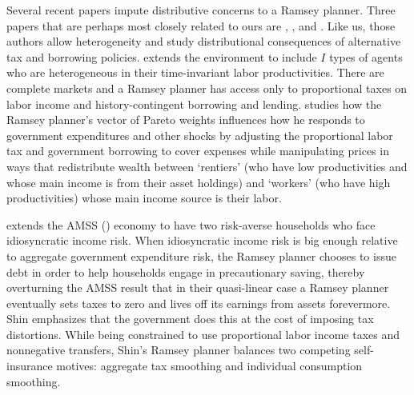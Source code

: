 \documentclass[thmsb,11pt]{article}
\begin{document}
Several recent papers impute distributive concerns to a Ramsey planner.
Three papers that are perhaps most closely related to ours are \citet{Bassetto1999}, \citet{shin2006ramsey}, and \citet{Wer07a}. Like us, those authors allow heterogeneity and study
distributional consequences of alternative tax and borrowing policies.
\citet{Bassetto1999} extends the \citet{LucasJr.1983} environment to include $I$ types of
agents who are heterogeneous in their time-invariant labor productivities. There are complete markets and a Ramsey planner  has access only
to proportional taxes on labor income and history-contingent borrowing and
lending. \citeauthor{Bassetto1999}  studies how the Ramsey planner's vector of Pareto weights
influences how he responds to government expenditures and other shocks by
adjusting the proportional labor tax and government borrowing to cover
expenses while manipulating prices in ways that redistribute wealth between
 `rentiers' (who have low productivities and  whose main income is from their asset holdings)
and  `workers' (who have high productivities) whose main income source is their labor.

\citet{shin2006ramsey} extends the AMSS  (\citet{Aiyagari2002}) economy to have two risk-averse households who
face idiosyncratic income risk. When idiosyncratic income risk is big enough
relative to aggregate government expenditure risk, the Ramsey planner
chooses to issue debt in order to help households engage in precautionary
saving, thereby overturning the AMSS result that  in their quasi-linear case a
 Ramsey planner  eventually sets taxes to zero and lives off its earnings from assets forevermore.
  Shin emphasizes that the
government does this at the cost of imposing tax distortions. While being
constrained to use proportional labor income taxes and nonnegative
transfers, Shin's Ramsey planner balances two competing self-insurance
motives: aggregate tax smoothing and individual consumption smoothing.
\end{document}
